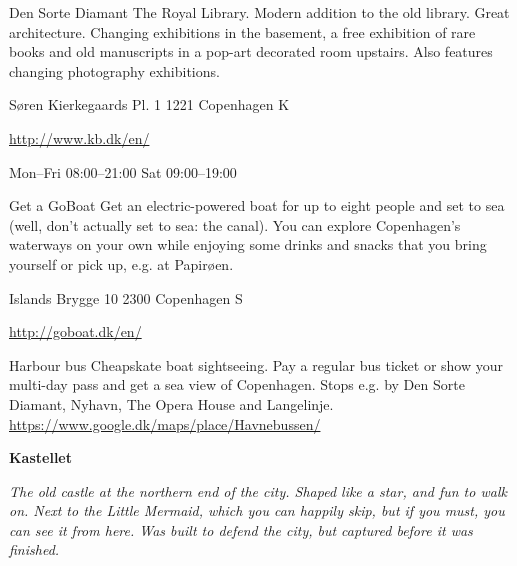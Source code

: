 \begin{funitem}
{Den Sorte Diamant}
{The Royal Library. Modern addition to the old library. Great architecture. Changing exhibitions in the basement, a free exhibition of rare books and old manuscripts in a pop-art decorated room upstairs. Also features changing photography exhibitions.}
{\begin{addr}
{Søren Kierkegaards Pl. 1}
{1221 Copenhagen K}
\end{addr}}
{\url{http://www.kb.dk/en/}}
{\begin{ohours}
{Mon–Fri}
{08:00–21:00}
{Sat}
{09:00–19:00}
{}
{}
{}
{}
\end{ohours}}
\end{funitem}
\begin{funitem}
{Get a GoBoat}
{Get an electric-powered boat for up to eight people and set to sea (well, don’t actually set to sea: the canal). You can explore Copenhagen’s waterways on your own while enjoying some drinks and snacks that you bring yourself or pick up, e.g. at Papirøen.}
{\begin{addr}
{Islands Brygge 10}
{2300 Copenhagen S}
\end{addr}}
{\url{http://goboat.dk/en/}}
{\begin{ohours}
{}
{}
{}
{}
{}
{}
{}
{}
\end{ohours}}
\end{funitem}
\begin{funitemshort}
{Harbour bus}
{Cheapskate boat sightseeing. Pay a regular bus ticket or show your multi-day pass  and get a sea view of Copenhagen. Stops e.g. by Den Sorte Diamant, Nyhavn, The Opera House and Langelinje.}
{\url{https://www.google.dk/maps/place/Havnebussen/ }}
\end{funitemshort}
\noindent\textbf{Kastellet}
\par\noindent\emph{The old castle at the northern end of the city. Shaped like a star, and fun to walk on. Next to the Little Mermaid, which you can happily skip, but if you must, you can see it from here. Was built to defend the city, but captured before it was finished.}
\medskip

